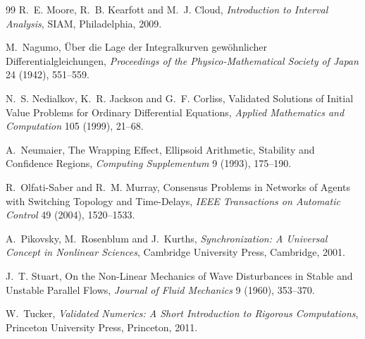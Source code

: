 \documentclass[11pt,notitlepage]{report}
\theoremstyle{definition}
\theoremstyle{remark}
\begin{document}
\begin{thebibliography}{99}
 R.~E. Moore, R.~B. Kearfott and M.~J. Cloud, \emph{Introduction to Interval Analysis}, SIAM, Philadelphia, 2009.

 M.~Nagumo, \"Uber die Lage der Integralkurven gew\"ohnlicher Differentialgleichungen, \emph{Proceedings of the Physico-Mathematical Society of Japan} 24 (1942), 551--559.

 N.~S. Nedialkov, K.~R. Jackson and G.~F. Corliss, Validated Solutions of Initial Value Problems for Ordinary Differential Equations, \emph{Applied Mathematics and Computation} 105 (1999), 21--68.

 A.~Neumaier, The Wrapping Effect, Ellipsoid Arithmetic, Stability and Confidence Regions, \emph{Computing Supplementum} 9 (1993), 175--190.

 R.~Olfati-Saber and R.~M. Murray, Consensus Problems in Networks of Agents with Switching Topology and Time-Delays, \emph{IEEE Transactions on Automatic Control} 49 (2004), 1520--1533.

 A.~Pikovsky, M.~Rosenblum and J.~Kurths, \emph{Synchronization: A Universal Concept in Nonlinear Sciences}, Cambridge University Press, Cambridge, 2001.

 J.~T. Stuart, On the Non-Linear Mechanics of Wave Disturbances in Stable and Unstable Parallel Flows, \emph{Journal of Fluid Mechanics} 9 (1960), 353--370.

 W.~Tucker, \emph{Validated Numerics: A Short Introduction to Rigorous Computations}, Princeton University Press, Princeton, 2011.

\end{thebibliography}
\end{document}
